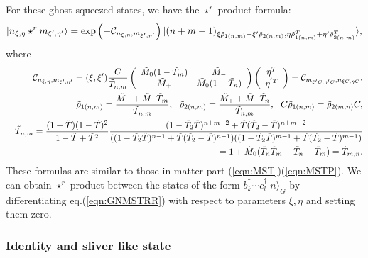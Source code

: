 \documentclass[12pt,a4paper]{article}
\def\T{{\tilde T}}
\def\M0{{\tilde M}_0}
\def\Mp{{\tilde M}_+}
\def\Mm{{\tilde M}_-}
\def\tm{{\tilde \mu}}
\begin{document}
For these ghost squeezed states, we have the $\star^r$ product formula:
\begin{equation}
\label{eqn:GNMSTRR}
|n_{\xi,\eta}\star^r m_{\xi',\eta'}\rangle=\exp\left(-{\cal C}_{n_{\xi,\eta},m_{\xi',\eta'}}\right)|(n+m-1)_{\xi{\tilde \rho}_{1(n,m)}+\xi'{\tilde \rho}_{2(n,m)},\eta{\tilde \rho}_{1(n,m)}^T+\eta'{\tilde \rho}_{2(n,m)}^T}\rangle,
\end{equation}
where
\begin{eqnarray}
&&{\cal C}_{n_{\xi,\eta},m_{\xi',\eta'}}=(\xi,\xi'){C\over\T_{n,m}}
\left(
\begin{array}{cc}
\M0 (1-\T_m)  & \Mm  \\
\Mp     & \M0 (1-\T_n)
\end{array}
\right)
\left(
\begin{array}{c}
\eta^T     \\
\eta^{'T}     
\end{array}
\right)={\cal C}_{m_{\xi'C,\eta'C},n_{\xi C,\eta C}},\nonumber \\
&&{\tilde \rho}_{1(n,m)}={\Mm +\Mp \T_m\over\T_{n,m}},\ \ {\tilde \rho}_{2(n,m)}={\Mp +\Mm \T_n\over\T_{n,m}},\ \ C{\tilde \rho}_{1(n,m)}={\tilde \rho}_{2(m,n)}C, \nonumber \\
&&\T_{n,m}={(1+\T )(1-\T )^2\over1-\T +\T^2} {(1-\T_2 \T)^{n+m-2}+\T (\T_2-\T )^{n+m-2}\over((1-\T_2 \T )^{n-1}+\T (\T_2- \T )^{n-1})((1-\T_2 \T )^{m-1}+\T (\T_2 -\T )^{m-1})}\nonumber \\
&&=1+\M0 (\T_n \T_m-\T_n-\T_m)=\T_{m,n}.
\end{eqnarray}
These formulas are similar to those in matter part (\ref{eqn:MST})(\ref{eqn:MSTP}). We can obtain $\star^r$ product between the states of the form $b_k^\dagger\cdots c^\dagger_l|n\rangle_G$ by differentiating eq.(\ref{eqn:GNMSTRR}) with respect to parameters $\xi,\eta$ and setting them zero.



\subsubsection{Identity and sliver like state}
\end{document}
